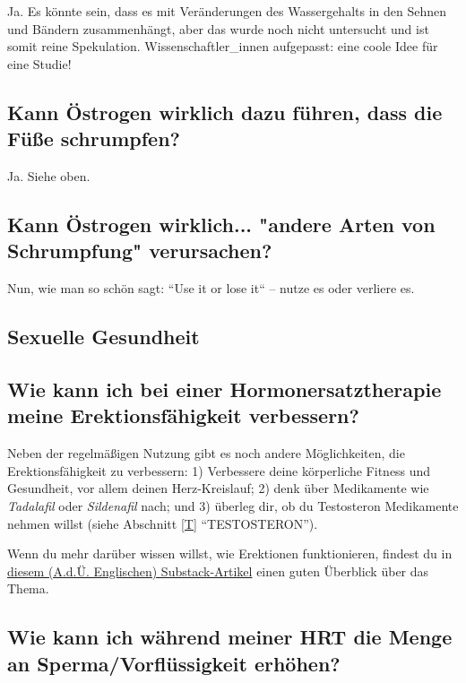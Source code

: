 \documentclass{article}
\begin{document}
Ja. Es könnte sein, dass es mit Veränderungen des Wassergehalts in den Sehnen und Bändern zusammenhängt, aber das wurde noch nicht untersucht und ist somit reine Spekulation. Wissenschaftler\_innen aufgepasst: eine coole Idee für eine Studie!

\subsection{Kann Östrogen wirklich dazu führen, dass die Füße schrumpfen?}

Ja. Siehe oben.

\subsection{Kann Östrogen wirklich... "andere Arten von Schrumpfung" verursachen?}

Nun, wie man so schön sagt: “Use it or lose it“ – nutze es oder verliere es.

\subsection*{Sexuelle Gesundheit}

\subsection{Wie kann ich bei einer Hormonersatztherapie meine Erektionsfähigkeit verbessern?}\label{11-20}

Neben der regelmäßigen Nutzung gibt es noch andere Möglichkeiten, die Erektionsfähigkeit zu verbessern: 1) Verbessere deine körperliche Fitness und Gesundheit, vor allem deinen Herz-Kreislauf; 2) denk über Medikamente wie \textit{Tadalafil} oder \textit{Sildenafil} nach; und 3) überleg dir, ob du Testosteron Medikamente nehmen willst (siehe Abschnitt \ref{T} “TESTOSTERON”).

Wenn du mehr darüber wissen willst, wie Erektionen funktionieren, findest du in \href{https://stainedglasswoman.substack.com/p/how-to-maintain-your-penis-function}{diesem (A.d.Ü. Englischen) Substack-Artikel} einen guten Überblick über das Thema.

\subsection{Wie kann ich während meiner HRT die Menge an Sperma/Vorflüssigkeit erhöhen?}
\end{document}
